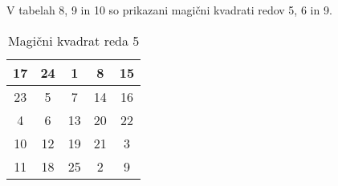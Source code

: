 \documentclass[a4paper,12pt]{article}
\begin{document}
V tabelah 8, 9 in 10 so prikazani
magični kvadrati redov 5, 6 in 9.
\begin{table}[h]
   \centering
   \caption{Magični kvadrat reda 5}
   \label{table:mag5}
   \begin{tabular}{|c|c|c|c|c|}
      \hline
      17 & 24 &  1 &  8 & 15 \\
      \hline
      23 &  5 &  7 & 14 & 16 \\
      \hline
      4 &  6 & 13 & 20 & 22 \\
      \hline
      10 & 12 & 19 & 21 &  3 \\
      \hline
      11 & 18 & 25 &  2 &  9 \\
      \hline
      
   \end{tabular}

\end{table}
\end{document}
